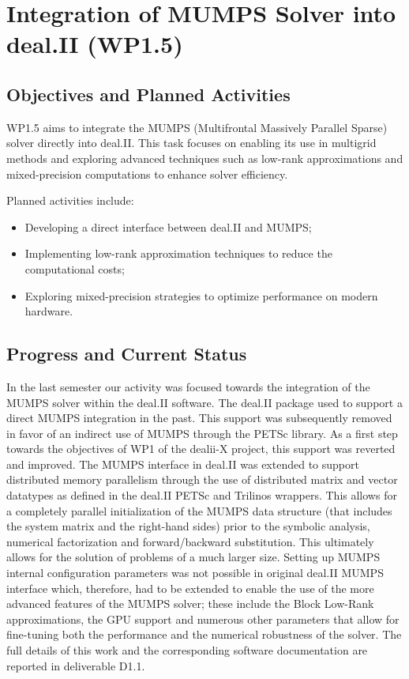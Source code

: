 \documentclass[a4paper,12pt]{article}
\begin{document}
\section{Integration of MUMPS Solver into deal.II (WP1.5)}
    \subsection{Objectives and Planned Activities}
    WP1.5 aims to integrate the MUMPS (Multifrontal Massively Parallel Sparse) solver directly into deal.II. This task focuses on enabling its use in multigrid methods and exploring advanced techniques such as low-rank approximations and mixed-pre\-ci\-sion computations to enhance solver efficiency.

    Planned activities include:
    \begin{itemize}
        \item Developing a direct interface between deal.II and MUMPS;
        \item Implementing low-rank approximation techniques to reduce the computational costs;
        \item Exploring mixed-precision strategies to optimize performance on modern hardware.
    \end{itemize}

    \subsection{Progress and Current Status}
  In the last semester our activity was focused towards the integration of the MUMPS solver within the deal.II software. The deal.II package used to support a direct MUMPS integration in the past. This support was subsequently removed in favor of an indirect use of MUMPS through the PETSc library. As a first step towards the objectives of WP1 of the dealii-X
project, this support was reverted and improved. The MUMPS interface in deal.II was extended to support distributed memory parallelism through the use of distributed matrix and vector datatypes as defined in the deal.II PETSc and Trilinos wrappers. This allows for a completely parallel initialization of the MUMPS data structure (that includes the system matrix and the right-hand sides) prior to the symbolic analysis, numerical factorization and forward/backward substitution. This ultimately allows for the solution of problems of a much larger size. Setting up MUMPS internal configuration parameters was not possible in original
deal.II MUMPS interface which, therefore, had to be extended to enable the use of the more advanced features of the MUMPS solver; these include the Block Low-Rank approximations, the GPU support and numerous other parameters that allow for fine-tuning both the performance and the numerical robustness of the solver. The full details of this work and the corresponding software documentation are reported in deliverable D1.1.


%

    
\label{MyLastPage}
\end{document}
